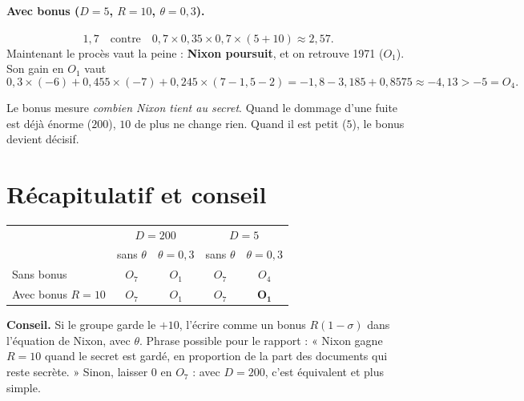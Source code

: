 \documentclass[11pt,a4paper]{article}
\theoremstyle{definition}
\begin{document}
\paragraph{Avec bonus ($D=5$, $R=10$, $\theta=0,3$).}
\[
1,7\quad\text{contre}\quad 0,7\times0,35\times0,7\times(5+10)\approx2,57 .
\]
Maintenant le procès vaut la peine : \textbf{Nixon poursuit}, et on retrouve 1971 ($O_1$). Son gain en $O_1$ vaut
\[
0,3\times(-6)+0,455\times(-7)+0,245\times(7-1,5-2)=-1,8-3,185+0,8575\approx-4,13>-5=O_4 .
\]
\begin{simple}
Le bonus mesure \emph{combien Nixon tient au secret}. Quand le dommage d'une fuite est déjà énorme ($200$), $10$ de plus ne change rien. Quand il est petit ($5$), le bonus devient décisif.
\end{simple}

\section{Récapitulatif et conseil}
\begin{center}
\small
\begin{tabular}{@{}lcccc@{}}
\toprule
 & \multicolumn{2}{c}{$D=200$} & \multicolumn{2}{c}{$D=5$} \\
 & sans $\theta$ & $\theta=0,3$ & sans $\theta$ & $\theta=0,3$ \\
\midrule
Sans bonus & $O_7$ & $O_1$ & $O_7$ & $O_4$ \\
Avec bonus $R=10$ & $O_7$ & $O_1$ & $O_7$ & $\mathbf{O_1}$ \\
\bottomrule
\end{tabular}
\end{center}
\begin{simple}
\textbf{Conseil.} Si le groupe garde le $+10$, l'écrire comme un bonus $R(1-\sigma)$ dans l'équation de Nixon, avec $\theta$. Phrase possible pour le rapport : « Nixon gagne $R=10$ quand le secret est gardé, en proportion de la part des documents qui reste secrète. » Sinon, laisser $0$ en $O_7$ : avec $D=200$, c'est équivalent et plus simple.
\end{simple}
\end{document}
